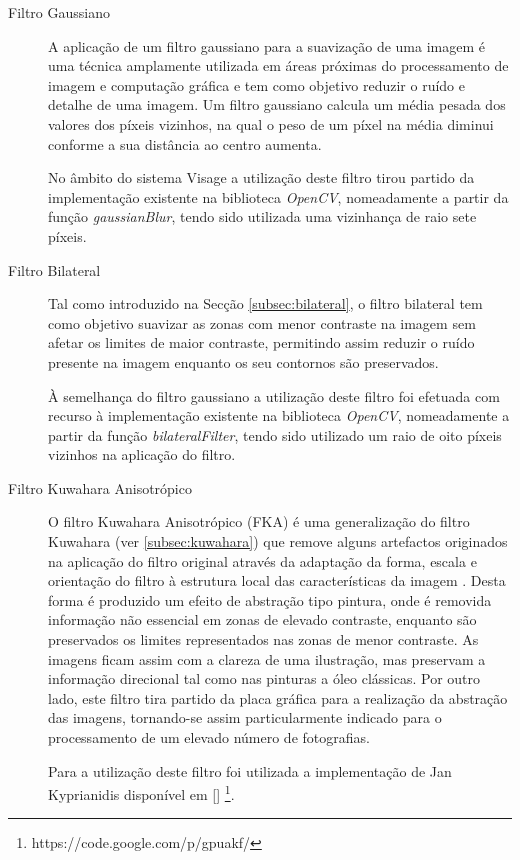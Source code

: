 \begin{description}
\item[Filtro Gaussiano]
A aplicação de um filtro gaussiano para a suavização de uma imagem é uma técnica amplamente utilizada em áreas próximas do processamento de imagem e computação gráfica e tem como objetivo reduzir o ruído e detalhe de uma imagem. Um filtro gaussiano calcula um média pesada dos valores dos píxeis vizinhos, na qual o peso de um píxel na média diminui conforme a sua distância ao centro aumenta.

No âmbito do sistema Visage a utilização deste filtro tirou partido da implementação existente na biblioteca \textit{OpenCV}, nomeadamente a partir da função \textit{gaussianBlur}, tendo sido utilizada uma vizinhança de raio sete píxeis.

\item[Filtro Bilateral]
Tal como introduzido na Secção \ref{subsec:bilateral}, o filtro bilateral tem como objetivo suavizar as zonas com menor contraste na imagem sem afetar os limites de maior contraste, permitindo assim reduzir o ruído presente na imagem enquanto os seu contornos são preservados.

À semelhança do filtro gaussiano a utilização deste filtro foi efetuada com recurso à implementação existente na biblioteca \textit{OpenCV}, nomeadamente a partir da função \textit{bilateralFilter}, tendo sido utilizado um raio de oito píxeis vizinhos na aplicação do filtro.

\item[Filtro Kuwahara Anisotrópico]
O filtro Kuwahara Anisotrópico (FKA) é uma generalização do filtro Kuwahara (ver \ref{subsec:kuwahara}) que remove alguns artefactos originados na aplicação do filtro original através da adaptação da forma, escala e orientação do filtro à estrutura local das características da imagem \cite{Kyprianidis2009}. Desta forma é produzido um efeito de abstração tipo pintura, onde é removida informação não essencial em zonas de elevado contraste, enquanto são preservados os limites representados nas zonas de menor contraste. As imagens ficam assim com a clareza de uma ilustração, mas preservam a informação direcional tal como nas pinturas a óleo clássicas. Por outro lado, este filtro tira partido da placa gráfica para a realização da abstração das imagens, tornando-se assim particularmente indicado para o processamento de um elevado número de fotografias.

Para a utilização deste filtro foi utilizada a implementação de Jan Kyprianidis disponível em [] \footnote{https://code.google.com/p/gpuakf/}.

\end{description}
